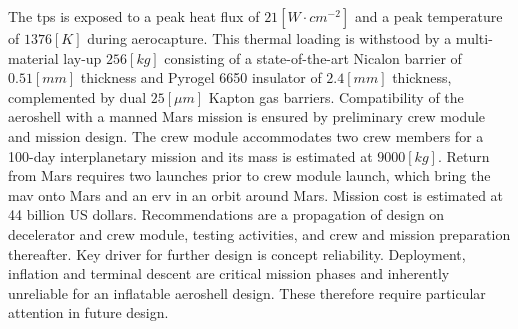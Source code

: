 \newline
\newline
The \acrlong{tps} is exposed to a peak heat flux of $21 \left[W \cdot cm^{-2}\right]$ and a peak temperature of $1376 \left[K\right]$ during aerocapture. This thermal loading is withstood by a multi-material lay-up $256 \left[kg\right]$ consisting of a state-of-the-art Nicalon barrier of $0.51 \left[mm\right]$ thickness and Pyrogel\textsuperscript{\textregistered} 6650 insulator of $2.4 \left[mm\right]$ thickness, complemented by dual $25 \left[\mu m\right]$ Kapton gas barriers. 
\newline
\newline
Compatibility of the aeroshell with a manned Mars mission is ensured by preliminary crew module and mission design. The crew module accommodates two crew members for a 100-day interplanetary mission and its mass is estimated at $9000 \left[kg\right]$. Return from Mars requires two launches prior to crew module launch, which bring the \acrlong{mav} onto Mars and an \acrlong{erv} in an orbit around Mars. Mission cost is estimated at 44 billion US dollars.
\newline
\newline
Recommendations are a propagation of design on decelerator and crew module, testing activities, and crew and mission preparation thereafter. Key driver for further design is concept reliability. Deployment, inflation and terminal descent are critical mission phases and inherently unreliable for an inflatable aeroshell design. These therefore require particular attention in future design.
